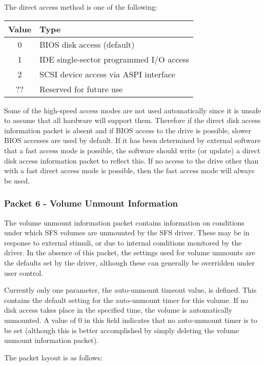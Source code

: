 The direct access method is one of the following:

\begin{center}
\begin{tabular}{|c|l|}
\hline
    Value &  Type\\
\hline
      0   &  BIOS disk access (default)\\
      1   &  IDE single-sector programmed I/O access\\
      2   &  SCSI device access via ASPI interface\\
     ??   &  Reserved for future use\\
\hline
\end{tabular}
\end{center}

Some of the high-speed access modes are not used automatically since it is
unsafe to assume that all hardware will support them.  Therefore if the direct
disk access information packet is absent and if BIOS access to the drive is
possible, slower BIOS accesses are used by default.  If it has been determined
by external software that a fast access mode is possible, the software should
write (or update) a direct disk access information packet to reflect this.  If
no access to the drive other than with a fast direct access mode is possible,
then the fast access mode will always be used.


\subsubsection{Packet 6 - Volume Unmount Information}

The volume unmount information packet contains information on conditions under
which SFS volumes are unmounted by the SFS driver.  These may be in response to
external stimuli, or due to internal conditions monitored by the driver.  In
the absence of this packet, the settings used for volume unmounts are the
defaults set by the driver, although these can generally be overridden under
user control.

Currently only one parameter, the auto-unmount timeout value, is defined.  This
contains the default setting for the auto-unmount timer for this volume.  If
no disk access takes place in the specified time, the volume is automatically
unmounted.  A value of 0 in this field indicates that no auto-unmount timer is
to be set (although this is better accomplished by simply deleting the volume
unmount information packet).

The packet layout is as follows:

